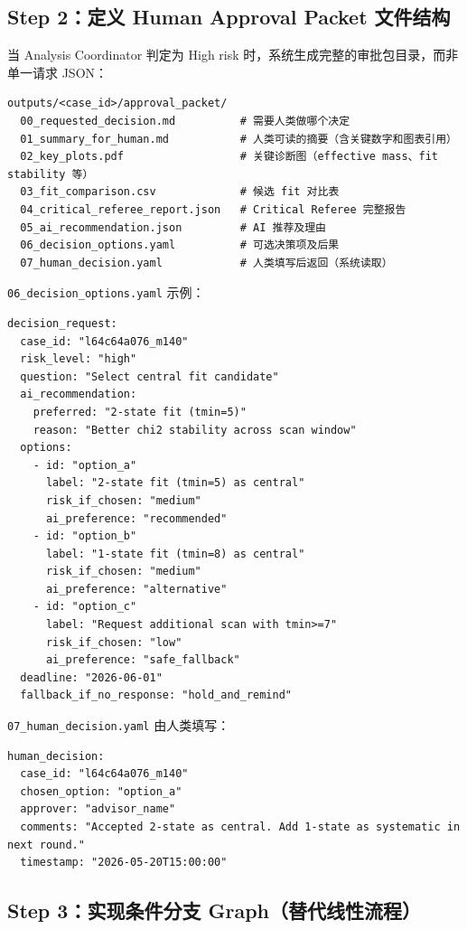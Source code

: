 \documentclass[11pt,a4paper,fontset=none]{ctexart}
\begin{document}
\subsection{Step 2：定义 Human Approval Packet 文件结构}

当 Analysis Coordinator 判定为 High risk 时，系统生成完整的审批包目录，而非单一请求 JSON：

\begin{lstlisting}
outputs/<case_id>/approval_packet/
  00_requested_decision.md          # 需要人类做哪个决定
  01_summary_for_human.md           # 人类可读的摘要（含关键数字和图表引用）
  02_key_plots.pdf                  # 关键诊断图（effective mass、fit stability 等）
  03_fit_comparison.csv             # 候选 fit 对比表
  04_critical_referee_report.json   # Critical Referee 完整报告
  05_ai_recommendation.json         # AI 推荐及理由
  06_decision_options.yaml          # 可选决策项及后果
  07_human_decision.yaml            # 人类填写后返回（系统读取）
\end{lstlisting}

\texttt{06\_decision\_options.yaml} 示例：
\begin{lstlisting}
decision_request:
  case_id: "l64c64a076_m140"
  risk_level: "high"
  question: "Select central fit candidate"
  ai_recommendation:
    preferred: "2-state fit (tmin=5)"
    reason: "Better chi2 stability across scan window"
  options:
    - id: "option_a"
      label: "2-state fit (tmin=5) as central"
      risk_if_chosen: "medium"
      ai_preference: "recommended"
    - id: "option_b"
      label: "1-state fit (tmin=8) as central"
      risk_if_chosen: "medium"
      ai_preference: "alternative"
    - id: "option_c"
      label: "Request additional scan with tmin>=7"
      risk_if_chosen: "low"
      ai_preference: "safe_fallback"
  deadline: "2026-06-01"
  fallback_if_no_response: "hold_and_remind"
\end{lstlisting}

\texttt{07\_human\_decision.yaml} 由人类填写：
\begin{lstlisting}
human_decision:
  case_id: "l64c64a076_m140"
  chosen_option: "option_a"
  approver: "advisor_name"
  comments: "Accepted 2-state as central. Add 1-state as systematic in next round."
  timestamp: "2026-05-20T15:00:00"
\end{lstlisting}

\subsection{Step 3：实现条件分支 Graph（替代线性流程）}
\end{document}
